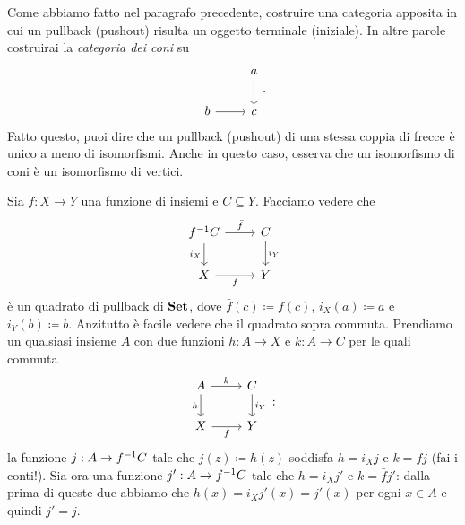 %

\begin{esercizio}
Come abbiamo fatto nel paragrafo precedente, costruire una categoria apposita in cui un pullback (pushout) risulta un oggetto terminale (iniziale). In altre parole costruirai la {\em categoria dei coni} su
\[\begin{tikzcd}
         & a \ar[d] \\
b \ar[r] & c  
\end{tikzcd}.\]
Fatto questo, puoi dire che un pullback (pushout) di una stessa coppia di frecce è unico a meno di isomorfismi. Anche in questo caso, osserva che un isomorfismo di coni è un isomorfismo di vertici.
\end{esercizio}

\begin{esempio}[Le preimmagini]
Sia \(f : X \to Y\) una funzione di insiemi e \(C \subseteq Y\). Facciamo vedere che
\[\begin{tikzcd}
\inv f C \ar["{\bar f}", r] \ar["{i_X}", swap, d] & C \ar["{i_Y}", d] \\
X \ar["f", swap, r]                               & Y 
\end{tikzcd}\]
è un quadrato di pullback di \(\mathbf{Set}\), dove \(\bar f (c) \coloneq f(c)\), \(i_X (a) \coloneq a\) e \(i_Y (b) \coloneq b\).\newline
Anzitutto è facile vedere che il quadrato sopra commuta. Prendiamo un qualsiasi insieme \(A\) con due funzioni \(h : A \to X\) e \(k : A \to C\) per le quali commuta
\[\begin{tikzcd}
A \ar["k", r] \ar["h", swap, d] & C \ar["{i_Y}", d] \\
X \ar["f", swap, r]             & Y 
\end{tikzcd}:\]
la funzione \(j : A \to f^{-1} C\) tale che \(j(z) \coloneq h(z)\) soddisfa \(h = i_X j\) e \(k = \bar f j\) (fai i conti!). Sia ora una funzione \(j' : A \to f^{-1} C\) tale che \(h = i_X j'\) e \(k = \bar f j'\): dalla prima di queste due abbiamo che \(h(x) = i_X j'(x) = j'(x)\) per ogni \(x \in A\) e quindi \(j' = j\).
\end{esempio}

